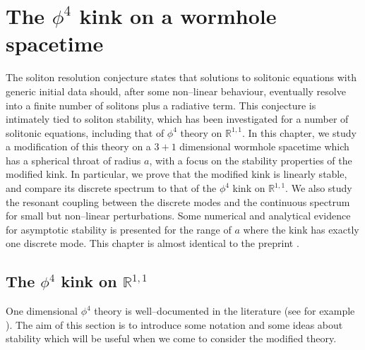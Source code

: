 \chapter{The $\phi^4$ kink on a wormhole spacetime} \label{chap:wormhole}


\graphicspath{{Chapter2/Figs/Static/}{Chapter2/Figs/Dynamic/}}



The soliton resolution conjecture \cite{TT} states that solutions to solitonic equations with generic initial data should, after some non--linear behaviour, eventually resolve into a finite number of solitons plus a radiative term. This conjecture is intimately tied to soliton stability, which has been investigated for a number of solitonic equations, including that of $\phi^4$ theory on $\mathbb{R}^{1,1}$. In this chapter, we study a modification of this theory on a $3+1$ dimensional wormhole spacetime which has a spherical throat of radius $a$, with a focus on the stability properties of the modified kink. In particular, we prove that the modified kink is linearly stable, and compare its discrete spectrum to that of the $\phi^4$ kink on $\mathbb{R}^{1,1}$. We also study the resonant coupling between the discrete modes and the continuous spectrum for small but non--linear perturbations. Some numerical and analytical evidence for asymptotic stability is presented for the range of $a$ where the kink has exactly one discrete mode. This chapter is almost identical to the preprint \cite{me}.

\section{The $\phi^4$ kink on $\mathbb{R}^{1,1}$}

One dimensional $\phi^4$ theory is well--documented in the literature (see for example \cite{Manton&Sutcliffe}). The aim of this section is to introduce some notation and some ideas about stability which will be useful when we come to consider the modified theory.

